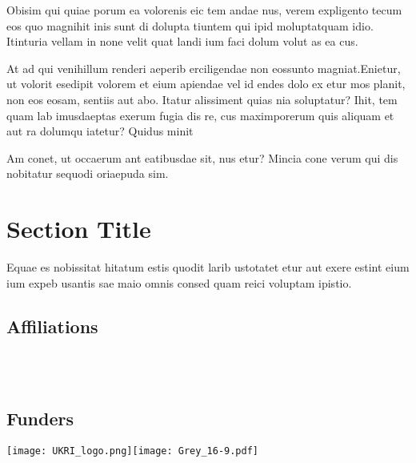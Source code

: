 \documentclass[
]{ImperialPoster}
\begin{document}
\begin{multicols}{3}
	{
		\small %
		 Obisim qui quiae porum ea volorenis eic tem andae nus, verem expligento tecum eos quo magnihit inis sunt di dolupta tiuntem qui ipid moluptatquam idio. Itinturia vellam in none velit quat landi ium faci dolum volut as ea cus.

		At ad qui venihillum renderi aeperib erciligendae non eossunto magniat.Enietur, ut volorit esedipit volorem et eium apiendae vel id endes dolo ex etur mos planit, non eos eosam, sentiis aut abo. Itatur alissiment quias nia soluptatur? Ihit, tem quam lab imusdaeptas exerum fugia dis re, cus maximporerum quis aliquam et aut ra dolumqu iatetur? Quidus minit

		Am conet, ut occaerum ant eatibusdae sit, nus etur? Mincia cone verum qui dis nobitatur sequodi oriaepuda sim.\par
	}

	\vspace{0.405\textheight} %

	\section{Section Title}

	Equae es nobissitat hitatum estis quodit larib ustotatet etur aut exere estint eium ium expeb usantis sae maio omnis consed quam reici voluptam ipistio.

	\subsection{Affiliations}

	\\
	\\

	\subsection{Funders}

	\texttt{[image: UKRI\_logo.png]}\hfill\texttt{[image: Grey\_16-9.pdf]} %


\end{multicols}
\end{document}
